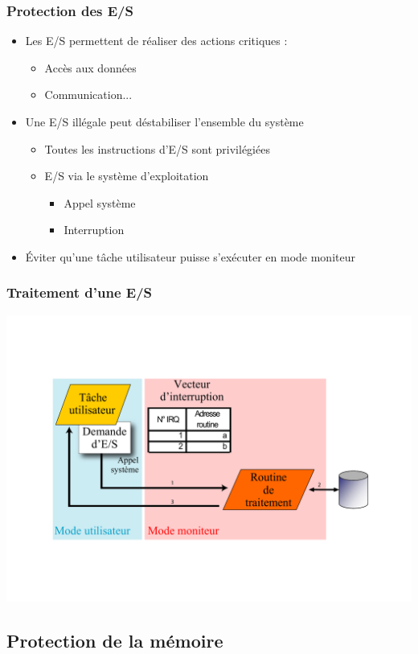 \begin{frame}
 \frametitle{Protection des E/S}
 \begin{itemize}
 \item Les E/S permettent de réaliser des actions critiques :
 \begin{itemize}
\item Accès aux données
\item Communication...
\end{itemize}
 \item Une E/S illégale peut déstabiliser l’ensemble du système
\begin{itemize}
\item Toutes les instructions d’E/S sont privilégiées
\item E/S via le système d’exploitation
\begin{itemize}
\item Appel système
\item Interruption
\end{itemize}
\end{itemize}
\item Éviter qu’une tâche utilisateur puisse s’exécuter en mode moniteur
 \end{itemize}
\end{frame}


\begin{frame}
 \frametitle{Traitement d’une E/S}
 \includegraphics[width=\textwidth]{../illustration/ES_mode_double.pdf}
\end{frame}


\subsection{Protection de la mémoire}

